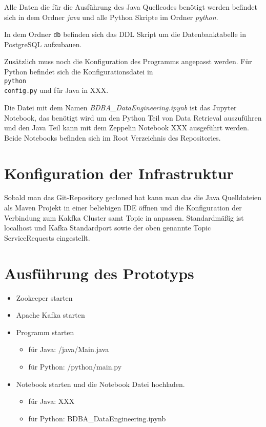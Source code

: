 Alle Daten die für die Ausführung des Java Quellcodes benötigt werden befindet sich in dem Ordner \textit{java}
und alle Python Skripte im Ordner \textit{python}.

In dem Ordner \texttt{db} befinden sich das DDL Skript um die Datenbanktabelle in PostgreSQL aufzubauen.

Zusätzlich muss noch die Konfiguration des Programms angepasst werden.
Für Python befindet sich die Konfigurationsdatei in \texttt{\\python\\config.py} und für Java in XXX.

Die Datei mit dem Namen \textit{BDBA\_DataEngineering.ipynb} ist das Jupyter Notebook, das benötigt wird um den Python Teil von Data Retrieval auszuführen
und den Java Teil kann mit dem Zeppelin Notebook XXX ausgeführt werden.
Beide Notebooks befinden sich im Root Verzeichnis des Repositories.

\section{Konfiguration der Infrastruktur}
Sobald man das Git-Repository gecloned hat kann man das die Java Quelldateien als Maven Projekt in einer beliebigen IDE öffnen und die Konfiguration der Verbindung zum Kakfka Cluster samt Topic in  anpassen. Standardmäßig ist localhost und Kafka Standardport sowie der oben genannte Topic ServiceRequests eingestellt.


\section{Ausführung des Prototyps}
\begin{itemize}
  \item Zookeeper starten
  \item Apache Kafka starten
  \item Programm starten
  \begin{itemize}
    \item für Java: /java/Main.java
    \item für Python: /python/main.py
  \end{itemize}
  \item Notebook starten und die Notebook Datei hochladen.
  \begin{itemize}
    \item für Java: XXX
    \item für Python: BDBA\_DataEngineering.ipynb
  \end{itemize}
\end{itemize}
